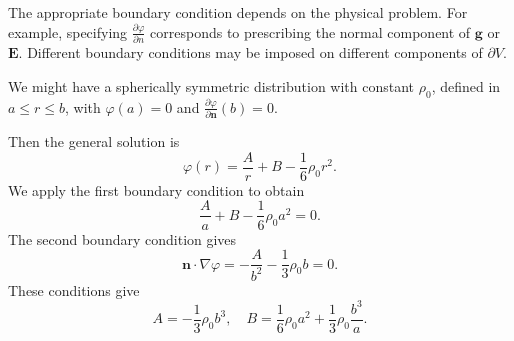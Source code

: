 \documentclass[a4paper]{article}
\begin{document}
\begin{rmk}
  The appropriate boundary condition depends on the physical problem. For example, specifying $\frac{\partial \varphi}{\partial n}$ corresponds to prescribing the normal component of $\mathbf{g}$ or $\mathbf{E}$. Different boundary conditions may be imposed on different components of $\partial V$.
\end{rmk}

\begin{eg}
  We might have a spherically symmetric distribution with constant $\rho_0$, defined in $a \leq r \leq b$, with $\varphi(a) = 0$ and $\frac{\partial \varphi}{\partial \mathbf{n}}(b) = 0$.

  Then the general solution is
  \[
    \varphi(r) = \frac{A}{r} + B - \frac{1}{6}\rho_0 r^2.
  \]
  We apply the first boundary condition to obtain
  \[
    \frac{A}{a} + B - \frac{1}{6}\rho_0 a^2 = 0.
  \]
  The second boundary condition gives
  \[
    \mathbf{n}\cdot \nabla \varphi = -\frac{A}{b^2} - \frac{1}{3}\rho_0 b = 0.
  \]
  These conditions give
  \[
    A = -\frac{1}{3}\rho_0 b^3, \quad B = \frac{1}{6}\rho_0 a^2 + \frac{1}{3}\rho_0 \frac{b^3}{a}.
  \]
\end{eg}
\end{document}

